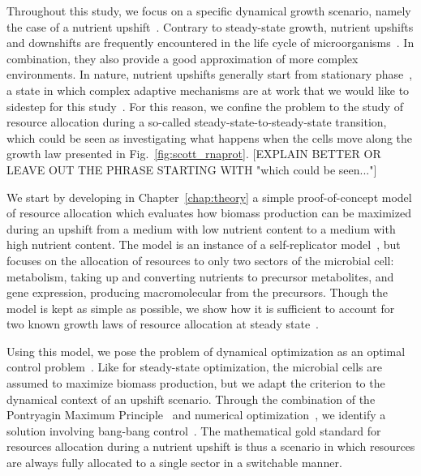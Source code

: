 Throughout this study, we focus on a specific dynamical growth scenario, namely the case of a nutrient upshift~\cite{ehrenberg_mediumdependent_2012,kjeldgaard_kinetics_1961,schaechter_patterns_1961,johnsen_control_1977}.
Contrary to steady-state growth, nutrient upshifts and downshifts are frequently encountered in the life cycle of microorganisms~\cite{schaechter_microbe_2006,mcarthur_microbial_2006,menge_nitrogen_2012,hobbie_microbes_2013}.
In combination, they also provide a good approximation of more complex environments.
In nature, nutrient upshifts generally start from stationary phase~\cite{mcarthur_microbial_2006,menge_nitrogen_2012,hobbie_microbes_2013}, a state in which complex adaptive mechanisms are at work that we would like to sidestep for this study~\cite{stragier_molecular_1996,gonzalez-pastor_cannibalism:_2011,ng_damage_1962,dufrenne_effect_1997,shaw_effect_1967,mcmeekin_predictive_2002,cheroutre-vialette_application_2002}.
For this reason, we confine the problem to the study of resource allocation during a so-called steady-state-to-steady-state transition, which could be seen as investigating what happens when the cells move along the growth law presented in Fig.~\ref{fig:scott_rnaprot}. [EXPLAIN BETTER OR LEAVE OUT THE PHRASE STARTING WITH "which could be seen..."]

We start by developing in Chapter~\ref{chap:theory} a simple proof-of-concept model of resource allocation which evaluates how biomass production can be maximized during an upshift from a medium with low nutrient content to a medium with high nutrient content.
The model is an instance of a self-replicator model~\cite{molenaar_shifts_2009}, but focuses on the allocation of resources to only two sectors of the microbial cell: metabolism, taking up and converting nutrients to precursor metabolites, and gene expression, producing macromolecular from the precursors.
Though the model is kept as simple as possible, we show how it is sufficient to account for two known growth laws of resource allocation at steady state~\cite{scott_interdependence_2010,scott_bacterial_2011}.

Using this model, we pose the problem of dynamical optimization as an optimal control problem~\cite{stengel_optimal_1994}.
Like for steady-state optimization, the microbial cells are assumed to maximize biomass production, but we adapt the criterion to the dynamical context of an upshift scenario.
Through the combination of the Pontryagin Maximum Principle~\cite{carlson_infinite_1991} and numerical optimization~\cite{bonnans_bocop_2012}, we identify a solution involving bang-bang control~\cite{stengel_optimal_1994}.
The mathematical gold standard for resources allocation during a nutrient upshift is thus a scenario in which resources are always fully allocated to a single sector in a switchable manner.

